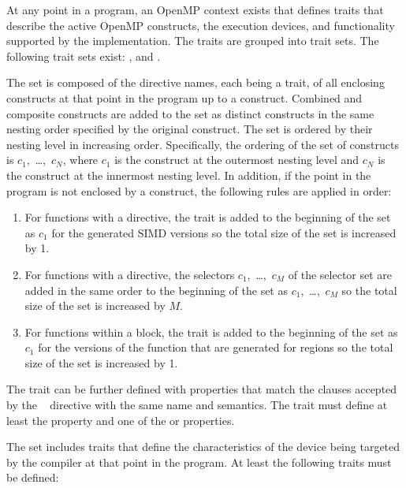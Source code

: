 At any point in a program, an OpenMP context exists that defines traits
that describe the active OpenMP constructs, the execution devices, and
functionality supported by the implementation. The traits are grouped into
trait sets. The following trait sets exist: ,  and
.

The  set is composed of the directive names, each being a
trait, of all enclosing constructs at that point in the program up
to a  construct. Combined and composite constructs are added
to the set as distinct constructs in the same nesting order specified by
the original construct. The set is ordered by their nesting level in
increasing order. Specifically, the ordering of the set of constructs is
$c_{1}$,~\ldots,~$c_{N}$, where $c_{1}$ is the construct at the 
outermost nesting level and $c_{N}$ is the construct at the innermost
nesting level. In addition, if the point in the program is not enclosed by
a  construct, the following rules are applied in order:

\begin{enumerate}
\item For functions with a  directive, the  trait
      is added to the beginning of the set as $c_{1}$ for the generated SIMD 
      versions so the total size of the set is increased by 1.
\item For functions with a  directive, the selectors 
      $c_{1}$,~\ldots,~$c_{M}$ of the  selector set are added 
      in the same order to the beginning of the set as $c_{1}$,~\ldots,~$c_{M}$
       so the total size of the set is increased by $M$.
\item For functions within a  block, the 
      trait is added to the beginning of the set as $c_{1}$ for the versions of 
      the function that are generated for  regions so the total 
      size of the set is increased by 1.
\end{enumerate}

The  trait can be further defined with properties that match the
clauses accepted by the ~ directive with the same
name and semantics. The  trait must define at least the
 property and one of  the  or  properties.

The  set includes traits that define the characteristics of the 
device being targeted by the compiler at that point in the program. At least 
the following traits must be defined:

